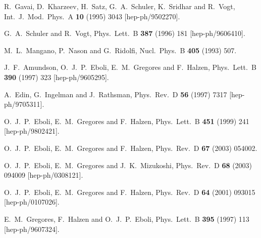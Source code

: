 \begin{thebibliography}{999}
R.~Gavai, D.~Kharzeev, H.~Satz, G.~A.~Schuler, K.~Sridhar and R.~Vogt,
Int.\ J.\ Mod.\ Phys.\ A {\bf 10} (1995) 3043
[hep-ph/9502270].

G.~A.~Schuler and R.~Vogt,
Phys.\ Lett.\ B {\bf 387} (1996) 181
[hep-ph/9606410].

M.~L.~Mangano, P.~Nason and G.~Ridolfi,
Nucl.\ Phys.\ B {\bf 405} (1993) 507.

J.~F.~Amundson, O.~J.~P.~Eboli, E.~M.~Gregores and F.~Halzen,
Phys.\ Lett.\ B {\bf 390} (1997) 323
[hep-ph/9605295].

A.~Edin, G.~Ingelman and J.~Rathsman,
Phys.\ Rev.\ D {\bf 56} (1997) 7317
[hep-ph/9705311].

O.~J.~P.~Eboli, E.~M.~Gregores and F.~Halzen,
Phys.\ Lett.\ B {\bf 451} (1999) 241
[hep-ph/9802421].

O.~J.~P.~Eboli, E.~M.~Gregores and F.~Halzen,
Phys.\ Rev.\ D {\bf 67} (2003) 054002.

O.~J.~P.~Eboli, E.~M.~Gregores and J.~K.~Mizukoshi,
Phys.\ Rev.\ D {\bf 68} (2003) 094009
[hep-ph/0308121].

O.~J.~P.~Eboli, E.~M.~Gregores and F.~Halzen,
Phys.\ Rev.\ D {\bf 64} (2001) 093015
[hep-ph/0107026].

E.~M.~Gregores, F.~Halzen and O.~J.~P.~Eboli,
Phys.\ Lett.\ B {\bf 395} (1997) 113
[hep-ph/9607324].


\end{thebibliography}

